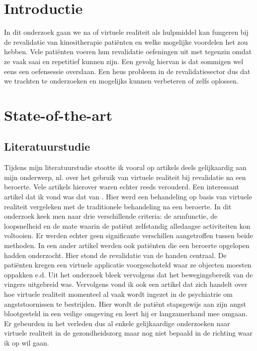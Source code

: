
\section{Introductie} %
\label{sec:introductie}

In dit onderzoek gaan we na of virtuele realiteit als hulpmiddel kan fungeren bij de revalidatie van kinesitherapie patiënten en welke mogelijke voordelen het zou hebben. Vele patiënten voeren hun revalidatie oefeningen uit met tegenzin omdat ze vaak saai en repetitief kunnen zijn. Een gevolg hiervan is dat sommigen wel eens een oefensessie overslaan. Een heus probleem in de revalidatiesector dus dat we trachten te onderzoeken en mogelijks kunnen verbeteren of zelfs oplossen.




\section{State-of-the-art}
\label{sec:state-of-the-art}

\subsection{Literatuurstudie}
Tijdens mijn literatuurstudie stootte ik vooral op artikels deels gelijkaardig aan mijn onderwerp, nl. over het gebruik van virtuele realiteit bij revalidatie na een beroerte. Vele artikels hierover waren echter reeds verouderd. Een interessant artikel dat ik vond was dat van \cite{Laver2017}. Hier werd een behandeling op basis van virtuele realiteit vergeleken met de traditionele behandeling na een beroerte. In dit onderzoek keek men naar drie verschillende criteria: de armfunctie, de loopsnelheid en de mate waarin de patiënt zelfstandig alledaagse activiteiten kon voltooien. Er werden echter geen significante verschillen aangetroffen tussen beide methoden. In een ander artikel \autocite{Boian2002} werden ook patiënten die een beroerte opgelopen hadden onderzocht. Hier stond de revalidatie van de handen centraal. De patiënten kregen een virtuele applicatie voorgeschoteld waar ze objecten moesten oppakken e.d. Uit het onderzoek bleek vervolgens dat het bewegingsbereik van de vingers uitgebreid was.  Vervolgens vond ik ook een artikel \autocite{Reddy2018} dat zich handelt over hoe virtuele realiteit momenteel al vaak wordt ingezet in de psychiatrie om angststoornissen te bestrijden. Hier wordt de patiënt stapsgewijs aan zijn angst blootgesteld in een veilige omgeving en leert hij er langzamerhand mee omgaan. Er gebeurden in het verleden dus al enkele gelijkaardige onderzoeken naar virtuele realiteit in de gezondheidszorg maar nog niet bepaald in de richting waar ik op wil gaan.

